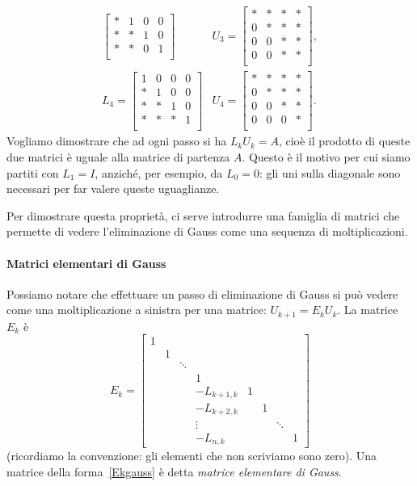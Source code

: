 \documentclass[a4paper]{report}
\theoremstyle{definiton}
\theoremstyle{remark}
\begin{document}
\[\begin{array}{ll}
\begin{bmatrix}
        * & 1 & 0 & 0\\
        * & * & 1 & 0\\        
        * & * & 0 & 1\\
    \end{bmatrix} & U_3 = \begin{bmatrix}
        * & * & * & *\\
        0 & * & * & *\\
        0 & 0 & * & *\\
        0 & 0 & * & *\\
    \end{bmatrix},\\[6ex]
    L_4 = \begin{bmatrix}
        1 & 0 & 0 & 0\\
        * & 1 & 0 & 0\\
        * & * & 1 & 0\\        
        * & * & * & 1\\
    \end{bmatrix} & U_4 = \begin{bmatrix}
        * & * & * & *\\
        0 & * & * & *\\
        0 & 0 & * & *\\
        0 & 0 & 0 & *\\
    \end{bmatrix}.
    \end{array}
\]
Vogliamo dimostrare che ad ogni passo si ha $L_k U_k = A$, cioè il prodotto di queste due matrici è uguale alla matrice di partenza $A$. Questo è il motivo per cui siamo partiti con $L_1 = I$, anziché, per esempio, da $L_0 = 0$: gli uni sulla diagonale sono necessari per far valere queste uguaglianze.

Per dimostrare questa proprietà, ci serve introdurre una famiglia di matrici che permette di vedere l'eliminazione di Gauss come una sequenza di moltiplicazioni.

\paragraph{Matrici elementari di Gauss} Possiamo notare che effettuare un passo di eliminazione di Gauss si può vedere come una moltiplicazione a sinistra per una matrice: $U_{k+1} = E_k U_k$. La matrice $E_k$ è
\begin{equation} \label{Ekgauss}
E_k = \begin{bmatrix}
    1 \\
    & 1\\
    && \ddots\\
    & & & 1\\
    & & & -L_{k+1,k} & 1\\
    & & & -L_{k+2,k} & & 1\\
    & & & \vdots & & & \ddots \\
    & & & -L_{n,k} & & & & 1
\end{bmatrix}
\end{equation}
(ricordiamo la convenzione: gli elementi che non scriviamo sono zero). Una matrice della forma~\eqref{Ekgauss} è detta \emph{matrice elementare di Gauss}.
\end{document}
